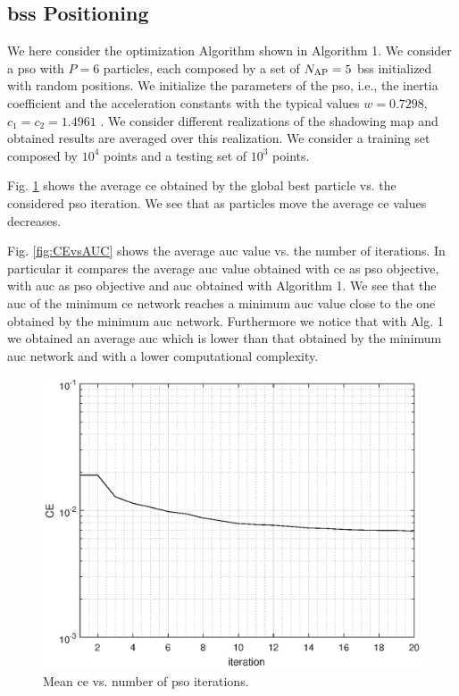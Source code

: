 \documentclass[twocolumns]{IEEEtran}
\begin{document}
\subsection{\acp{bs} Positioning}
We here consider the optimization Algorithm shown in Algorithm 1. We consider a \ac{pso} with $P=6$ particles, each composed by a set of $N_{\rm AP}=5$ \acp{bs} initialized with random positions. We initialize the parameters of the \ac{pso}, i.e., the inertia coefficient and the acceleration constants with the typical values $w=0.7298$, $c_1=c_2=1.4961$ \cite{Kennedy-11}. We consider different realizations of the shadowing map and obtained results are averaged over this realization. We consider a training set composed by $10^4$ points and a testing set of $10^3$ points.

Fig. \ref{fig:CE} shows the average \ac{ce} obtained by the global best particle vs. the considered \ac{pso} iteration. We see that as particles move the average \ac{ce} values decreases.

Fig. \ref{fig:CEvsAUC} shows the average \ac{auc} value vs. the number of iterations. In particular it compares the average \ac{auc} value obtained with \ac{ce} as \ac{pso} objective, with \ac{auc} as \ac{pso} objective and \ac{auc} obtained with Algorithm 1. We see that the \ac{auc} of the minimum \ac{ce} network reaches a minimum \ac{auc} value close to the one obtained by the minimum \ac{auc} network. Furthermore we notice that with Alg. 1 we obtained an average \ac{auc} which is lower than that obtained by the minimum \ac{auc} network and with a lower computational complexity.

\begin{figure}[t]
    \centering
    \includegraphics[width=1\columnwidth]{CE_71_real.eps}
    \caption{Mean \ac{ce} vs. number of \ac{pso} iterations. }
    \label{fig:CE}
\end{figure}
\end{document}
